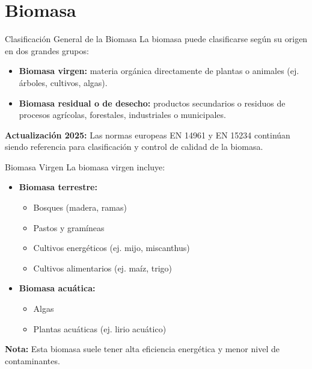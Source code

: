 \documentclass[../../main.tex]{subfiles}
\begin{document}
\section{Biomasa}
\begin{frame}{Clasificación General de la Biomasa}
\justifying
La biomasa puede clasificarse según su origen en dos grandes grupos:

\begin{itemize}
  \item \textbf{Biomasa virgen:} materia orgánica directamente de plantas o animales (ej. árboles, cultivos, algas).
  \item \textbf{Biomasa residual o de desecho:} productos secundarios o residuos de procesos agrícolas, forestales, industriales o municipales.
\end{itemize}

\vspace{1em}
\textbf{Actualización 2025:} Las normas europeas EN 14961 y EN 15234 continúan siendo referencia para clasificación y control de calidad de la biomasa.
\end{frame}

\begin{frame}{Biomasa Virgen}
\justifying
La biomasa virgen incluye:

\begin{itemize}
  \item \textbf{Biomasa terrestre:}
    \begin{itemize}
      \item Bosques (madera, ramas)
      \item Pastos y gramíneas
      \item Cultivos energéticos (ej. mijo, miscanthus)
      \item Cultivos alimentarios (ej. maíz, trigo)
    \end{itemize}
  \item \textbf{Biomasa acuática:}
    \begin{itemize}
      \item Algas
      \item Plantas acuáticas (ej. lirio acuático)
    \end{itemize}
\end{itemize}

\vspace{0.5em}
\textbf{Nota:} Esta biomasa suele tener alta eficiencia energética y menor nivel de contaminantes.
\end{frame}
\end{document}
